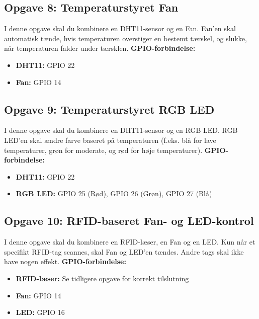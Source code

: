 \subsection{Opgave 8: Temperaturstyret Fan}
I denne opgave skal du kombinere en DHT11-sensor og en Fan. Fan'en skal automatisk tænde, hvis temperaturen overstiger en bestemt tærskel, og slukke, når temperaturen falder under tærsklen.
\newline\newline\noindent
\textbf{GPIO-forbindelse:}
\begin{itemize}
	\item \textbf{DHT11:} GPIO 22
	\item \textbf{Fan:} GPIO 14
\end{itemize}

\subsection{Opgave 9: Temperaturstyret RGB LED}
I denne opgave skal du kombinere en DHT11-sensor og en RGB LED. RGB LED'en skal ændre farve baseret på temperaturen (f.eks. blå for lave temperaturer, grøn for moderate, og rød for høje temperaturer).
\noindent
\textbf{GPIO-forbindelse:}
\begin{itemize}
	\item \textbf{DHT11:} GPIO 22
	\item \textbf{RGB LED:} GPIO 25 (Rød), GPIO 26 (Grøn), GPIO 27 (Blå)
\end{itemize}

\subsection{Opgave 10: RFID-baseret Fan- og LED-kontrol}
I denne opgave skal du kombinere en RFID-læser, en Fan og en LED. Kun når et specifikt RFID-tag scannes, skal Fan og LED'en tændes. Andre tags skal ikke have nogen effekt.
\newline\newline\noindent
\textbf{GPIO-forbindelse:}
\begin{itemize}
	\item \textbf{RFID-læser:} Se tidligere opgave for korrekt tilslutning
	\item \textbf{Fan:} GPIO 14
	\item \textbf{LED:} GPIO 16
\end{itemize}
